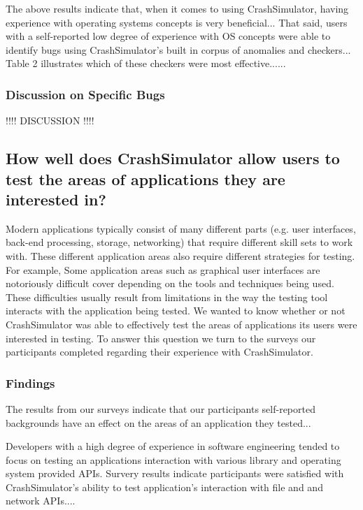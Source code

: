 The above results indicate that, when it comes to using CrashSimulator,
having experience with operating systems concepts is very beneficial...
That said, users with a self-reported low degree of experience with OS
concepts were able to identify bugs using CrashSimulator's built in corpus
of anomalies and checkers...  Table 2 illustrates which of these checkers
were most effective......


\subsubsection{Discussion on Specific Bugs}

!!!! DISCUSSION !!!!


\subsection{How well does CrashSimulator allow users to test the areas of
applications they are interested in?}

Modern applications typically consist of many different parts (e.g. user
interfaces,  back-end processing, storage, networking) that require
different skill sets to work with.  These different application areas also
require different strategies for testing.  For example, Some application
areas such as graphical user interfaces are notoriously difficult cover
depending on the tools and techniques being used.  These difficulties
usually result from limitations in the way the testing tool interacts with
the application being tested. We wanted to know whether or not
CrashSimulator was able to effectively test the areas of applications its
users were interested in testing.  To answer this question we turn to the
surveys our participants completed regarding their experience with
CrashSimulator.


\subsubsection{Findings}

The results from our surveys indicate that our participants self-reported
backgrounds have an effect on the areas of an application they tested...

Developers with a high degree of experience in software engineering tended
to focus on testing an applications interaction with various library and
operating system provided APIs.  Survery results indicate participants were
satisfied with CrashSimulator's ability to test application's interaction
with file and and network APIs....

